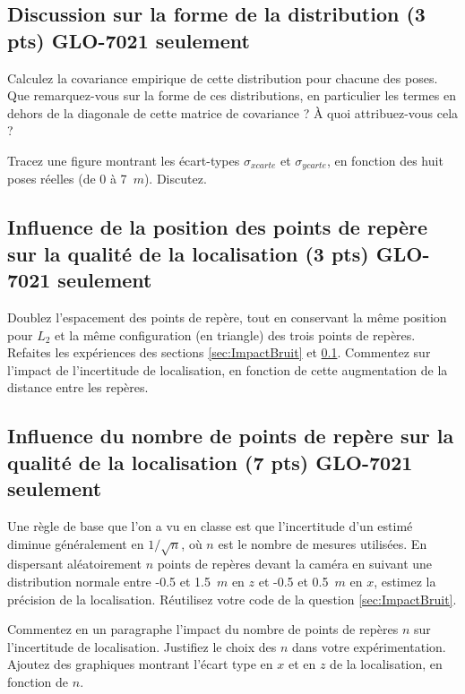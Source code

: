 \documentclass[12pt]{article}
\begin{document}
\subsection{Discussion sur la forme de la distribution  (3 pts) GLO-7021 seulement}
\label{sec:FormeDistr}

Calculez la covariance empirique de cette distribution pour chacune des poses. Que remarquez-vous sur la forme de ces distributions, en particulier les termes en dehors de la diagonale de cette matrice de covariance ? À quoi attribuez-vous cela ?

Tracez une figure montrant les écart-types $\sigma_{xcarte}$ et  $\sigma_{ycarte}$, en fonction des huit poses réelles (de 0 à 7~$m$). Discutez.

\subsection{Influence de la position des points de repère sur la qualité de la localisation (3 pts) GLO-7021 seulement}
Doublez l'espacement des points de repère, tout en conservant la même position pour $L_2$ et la même configuration (en triangle) des trois points de repères. Refaites les expériences des sections \ref{sec:ImpactBruit} et \ref{sec:FormeDistr}. Commentez sur l'impact de l'incertitude de localisation, en fonction de cette augmentation de la distance entre les repères.

\subsection{Influence du nombre de points de repère sur la qualité de la localisation  (7 pts) GLO-7021 seulement}
Une règle de base que l'on a vu en classe est que l'incertitude d'un estimé diminue généralement en $1/\sqrt{n}$, où $n$ est le nombre de mesures utilisées. En dispersant aléatoirement $n$ points de repères devant la caméra en suivant une distribution normale entre -0.5 et 1.5~$m$ en $z$ et -0.5 et 0.5~$m$ en $x$, estimez la précision de la localisation. Réutilisez votre code de la question \ref{sec:ImpactBruit}. 

Commentez en un paragraphe l'impact du nombre de points de repères $n$ sur l'incertitude de localisation. Justifiez le choix des $n$ dans votre expérimentation. Ajoutez des graphiques montrant l'écart type en $x$ et en $z$ de la localisation, en fonction de $n$.
\end{document}
